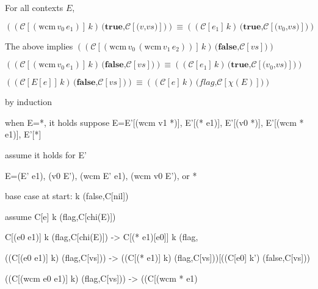 \documentclass[ms,electronic,twosidetoc,letterpaper,chaptercenter,parttop]{byumsphd}
\begin{document}
\begin{theorem}
For all contexts $E$,

$((\mathcal{C}[(\mathrm{wcm}\,v_0\,e_1)]\,k)\,\textbf{(}\textbf{true}\textbf{,}\mathcal{C}[\textbf{(}v\textbf{,}vs\textbf{)}]\textbf{)})\equiv((\mathcal{C}[e_1]\,k)\,\textbf{(}\textbf{true}\textbf{,}\mathcal{C}[\textbf{(}v_0\textbf{,}vs\textbf{)}]\textbf{)})$

The above implies $((\mathcal{C}[(\mathrm{wcm}\,v_0\,(\mathrm{wcm}\,v_1\,e_2))]\,k)\,\textbf{(}\textbf{false}\textbf{,}\mathcal{C}[vs]\textbf{)})$

$((\mathcal{C}[(\mathrm{wcm}\,v_0\,e_1)]\,k)\,\textbf{(}\textbf{false}\textbf{,}\mathcal{C}[vs]\textbf{)})\equiv((\mathcal{C}[e_1]\,k)\,\textbf{(}\textbf{true}\textbf{,}\mathcal{C}[\textbf{(}v_0\textbf{,}vs\textbf{)}]\textbf{)})$

$((\mathcal{C}[E[e]]\,k)\,\textbf{(}\textbf{false}\textbf{,}\mathcal{C}[vs]\textbf{)})\equiv((\mathcal{C}[e]\,k)\,\textbf{(}\textit{flag}\textbf{,}\mathcal{C}[\chi(E)]\textbf{)})$

by induction

when E=*, it holds
suppose E=E'[(wcm v1 *)], E'[(* e1)], E'[(v0 *)], E'[(wcm * e1)], E'[*]

assume it holds for E'

E=(E' e1), (v0 E'), (wcm E' e1), (wcm v0 E'), or *


base case at start: k (false,C[nil])

assume C[e] k (flag,C[chi(E)])

C[(e0 e1)] k (flag,C[chi(E)]) -> C[(* e1)[e0]] k (flag,


   ((C[(e0 e1)] k) (flag,C[vs]))
-> ((C[(* e1)] k) (flag,C[vs]))[((C[e0] k') (false,C[vs]))

   ((C[(wcm e0 e1)] k) (flag,C[vs]))
-> ((C[(wcm * e1)


\end{theorem}
\end{document}
